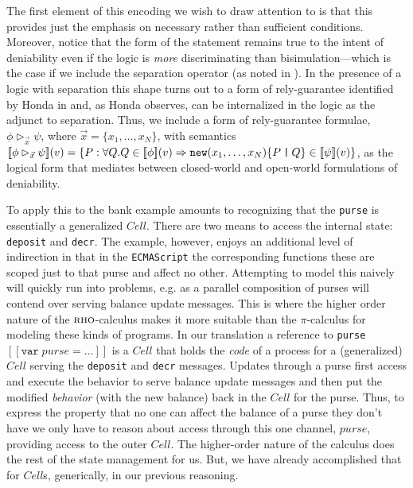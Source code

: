 \documentclass[]{acm_proc_article-sp}
\newcommand{\ldb}{[\![}
\newcommand{\rdb}{]\!]}
\newcommand{\id}[1]{\texttt{#1}}
\newcommand{\juxtap}{\mathbin{\id{|}}}
\newcommand{\binpar}[2]{#1 \juxtap #2}
\newcommand{\meaningof}[1]{\ldb #1 \rdb}
\newcommand{\pmeaningof}[1]{\ldb #1 \rdb}
\numberwithin{equation}{subsection}
\newcommand{\pic}{$\pi$-calculus}
\newcommand{\rhoc}{${\textsc{rho}}$-calculus}
\begin{document}
The first element of this encoding we wish to draw attention to is
that this provides just the emphasis on necessary rather than
sufficient conditions. Moreover, notice that the form of the statement
remains true to the intent of deniability even if the logic is
\emph{more} discriminating than bisimulation---which is the case if
we include the separation operator (as noted in
\cite{DBLP:conf/fossacs/Caires04}). In the presence of a logic with
separation this shape turns out to a form of rely-guarantee identified
by Honda in \cite{Honda:2008:UTP:2227536.2227558} and, as Honda
observes, can be internalized in the logic as the adjunct to
separation. Thus, we include a form of rely-guarantee formulae, $\phi
\rhd_{\vec{x}} \psi$, where $\vec{x} = \{ x_1,\ldots,x_N\}$, with
semantics $\pmeaningof{\phi \rhd_{\vec{x}} \psi}( v ) = \{ P : \forall
Q. Q \in \pmeaningof{\phi}( v ) \Rightarrow
\mbox{\texttt{new}}(x_1,\ldots,x_N)\mbox{\{}\binpar{P}{Q}\mbox{\}}\in
\pmeaningof{\psi}(v) \}$, as the logical form that mediates between
closed-world and open-world formulations of deniability.

To apply this to the bank example amounts to recognizing that the
\texttt{purse} is essentially a generalized $Cell$. There are two
means to access the internal state: \texttt{deposit} and
\texttt{decr}. The example, however, enjoys an additional level of
indirection in that in the \texttt{ECMAScript} the corresponding
functions these are scoped just to that purse and affect no
other. Attempting to model this naively will quickly run into
problems, e.g.  as a parallel composition of purses will contend over
serving balance update messages. This is where the higher order nature
of the {\rhoc} makes it more suitable than the {\pic} for modeling
these kinds of programs. In our translation a reference to
\texttt{purse} $\meaningof{\texttt{var}\; purse = \ldots}$ is a $Cell$
that holds the \emph{code} of a process for a (generalized) $Cell$
serving the \texttt{deposit} and \texttt{decr} messages. Updates
through a purse first access and execute the behavior to serve balance
update messages and then put the modified \emph{behavior} (with the
new balance) back in the $Cell$ for the purse. Thus, to express the
property that no one can affect the balance of a purse they don't have
\cite{Drossopoulou:2013:NCP:2489804.2489811} we only have to reason
about access through this one channel, $purse$, providing access to
the outer $Cell$. The higher-order nature of the calculus does the
rest of the state management for us. But, we have already accomplished
that for $Cell$s, generically, in our previous reasoning.
\end{document}
